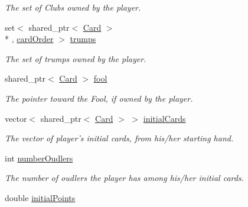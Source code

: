\begin{DoxyCompactItemize}
\begin{DoxyCompactList}\small\item\em The set of Clubs owned by the player. \end{DoxyCompactList}\item 
\hypertarget{classPlayer_a66b3455fc8c6685a78eb193a015a07a0}{set$<$ shared\-\_\-ptr$<$ \hyperlink{classCard}{Card} $>$\\*
, \hyperlink{structPlayer_1_1cardOrder}{card\-Order} $>$ \hyperlink{classPlayer_a66b3455fc8c6685a78eb193a015a07a0}{trumps}}\label{classPlayer_a66b3455fc8c6685a78eb193a015a07a0}

\begin{DoxyCompactList}\small\item\em The set of trumps owned by the player. \end{DoxyCompactList}\item 
\hypertarget{classPlayer_a9dfead246bd18b99398c89777290a162}{shared\-\_\-ptr$<$ \hyperlink{classCard}{Card} $>$ \hyperlink{classPlayer_a9dfead246bd18b99398c89777290a162}{fool}}\label{classPlayer_a9dfead246bd18b99398c89777290a162}

\begin{DoxyCompactList}\small\item\em The pointer toward the Fool, if owned by the player. \end{DoxyCompactList}\item 
\hypertarget{classPlayer_aac0d154d58a07310ee23c3c763f2cfa9}{vector$<$ shared\-\_\-ptr$<$ \hyperlink{classCard}{Card} $>$ $>$ \hyperlink{classPlayer_aac0d154d58a07310ee23c3c763f2cfa9}{initial\-Cards}}\label{classPlayer_aac0d154d58a07310ee23c3c763f2cfa9}

\begin{DoxyCompactList}\small\item\em The vector of player's initial cards, from his/her starting hand. \end{DoxyCompactList}\item 
\hypertarget{classPlayer_a9f218c1ff377eaeb7a336156410f7386}{int \hyperlink{classPlayer_a9f218c1ff377eaeb7a336156410f7386}{number\-Oudlers}}\label{classPlayer_a9f218c1ff377eaeb7a336156410f7386}

\begin{DoxyCompactList}\small\item\em The number of oudlers the player has among his/her initial cards. \end{DoxyCompactList}\item 
\hypertarget{classPlayer_af625acf7f8ad267630c7e3bd50d2683b}{double \hyperlink{classPlayer_af625acf7f8ad267630c7e3bd50d2683b}{initial\-Points}}\label{classPlayer_af625acf7f8ad267630c7e3bd50d2683b}


\end{DoxyCompactItemize}
